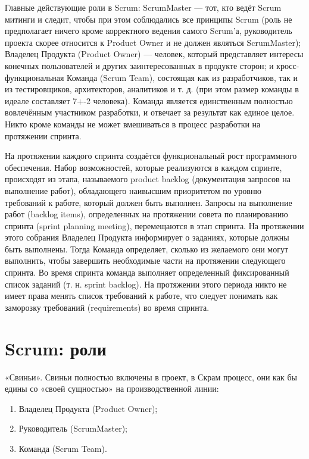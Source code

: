 \documentclass{article}
\let\stdsection\section
\renewcommand\section{\newpage\stdsection}
\begin{document}
    Главные действующие роли в Scrum: ScrumMaster — тот, кто ведёт Scrum митинги и следит, чтобы при этом соблюдались все принципы Scrum (роль не предполагает ничего кроме корректного ведения самого Scrum'а, руководитель проекта скорее относится к Product Owner и не должен являться ScrumMaster); Владелец Продукта (Product Owner) — человек, который представляет интересы конечных пользователей и других заинтересованных в продукте сторон; и кросс-функциональная Команда (Scrum Team), состоящая как из разработчиков, так и из тестировщиков, архитекторов, аналитиков и т. д. (при этом размер команды в идеале составляет 7+-2 человека). Команда является единственным полностью вовлечённым участником разработки, и отвечает за результат как единое целое. Никто кроме команды не может вмешиваться в процесс разработки на протяжении спринта.

    На протяжении каждого спринта создаётся функциональный рост программного обеспечения. Набор возможностей, которые реализуются в каждом спринте, происходят из этапа, называемого product backlog (документация запросов на выполнение работ), обладающего наивысшим приоритетом по уровню требований к работе, который должен быть выполнен. Запросы на выполнение работ (backlog items), определенных на протяжении совета по планированию спринта (sprint planning meeting), перемещаются в этап спринта. На протяжении этого собрания Владелец Продукта информирует о заданиях, которые должны быть выполнены. Тогда Команда определяет, сколько из желаемого они могут выполнить, чтобы завершить необходимые части на протяжении следующего спринта. Во время спринта команда выполняет определенный фиксированный список заданий (т. н. sprint backlog). На протяжении этого периода никто не имеет права менять список требований к работе, что следует понимать как заморозку требований (requirements) во время спринта.

\section{Scrum: роли}
    «Свиньи». Свиньи полностью включены в проект, в Скрам процесс, они как бы едины со «своей сущностью» на производственной линии:
    \begin{enumerate}
        \item Владелец Продукта (Product Owner);
        \item Руководитель (ScrumMaster);
        \item Команда (Scrum Team).
    \end{enumerate}
\end{document}

